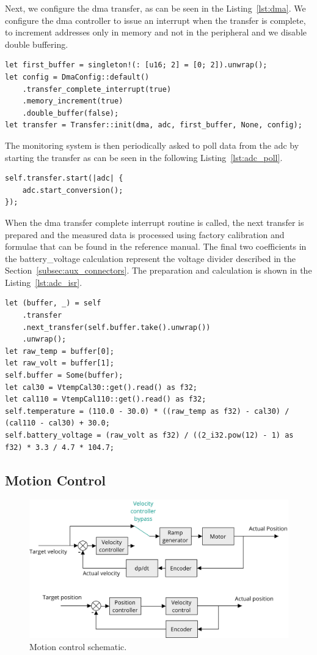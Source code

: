 Next, we configure the \acs{dma} transfer, as can be seen in the Listing~\ref{lst:dma}.
We configure the \acs{dma} controller to issue an interrupt when the transfer is complete, to increment addresses only in memory and not in the peripheral and we disable double buffering.

\begin{lstlisting}[caption={Configuration of the DMA controller for ADC transfers.},label=lst:dma]
let first_buffer = singleton!(: [u16; 2] = [0; 2]).unwrap();
let config = DmaConfig::default()
    .transfer_complete_interrupt(true)
    .memory_increment(true)
    .double_buffer(false);
let transfer = Transfer::init(dma, adc, first_buffer, None, config);
\end{lstlisting}

The monitoring system is then periodically asked to poll data from the \acs{adc} by starting the transfer as can be seen in the following Listing~\ref{lst:adc_poll}.
\begin{lstlisting}[caption={Polling the ADC.},label=lst:adc_poll]
self.transfer.start(|adc| {
    adc.start_conversion();
});
\end{lstlisting}
When the \acs{dma} transfer complete interrupt routine is called, the next transfer is prepared and the measured data is processed using factory calibration and formulae that can be found in the reference manual\cite{stmicro_stm32f405xx_2020}.
The final two coefficients in the battery\_voltage calculation represent the voltage divider described in the Section~\ref{subsec:aux_connectors}.
The preparation and calculation is shown in the Listing~\ref{lst:adc_isr}.
\begin{lstlisting}[caption={Processing the data measured by the ADC.},label=lst:adc_isr]
let (buffer, _) = self
    .transfer
    .next_transfer(self.buffer.take().unwrap())
    .unwrap();
let raw_temp = buffer[0];
let raw_volt = buffer[1];
self.buffer = Some(buffer);
let cal30 = VtempCal30::get().read() as f32;
let cal110 = VtempCal110::get().read() as f32;
self.temperature = (110.0 - 30.0) * ((raw_temp as f32) - cal30) / (cal110 - cal30) + 30.0;
self.battery_voltage = (raw_volt as f32) / ((2_i32.pow(12) - 1) as f32) * 3.3 / 4.7 * 104.7;
\end{lstlisting}

\subsection{Motion Control}
\label{subsec:motion_control}

\begin{figure}[H]
    \centering
    \includegraphics[width=\textwidth]{obrazky/motion_control}
    \caption{Motion control schematic.}
    \label{fig:motion_control}
\end{figure}
